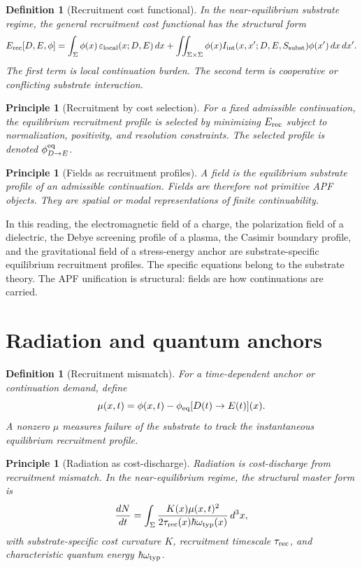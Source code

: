 \documentclass[11pt]{article}
\newtheorem{definition}[theorem]{Definition}
\newtheorem{principle}[theorem]{Principle}
\theoremstyle{remark}
\newcommand{\Erec}{E_{\rm rec}}
\begin{document}
\begin{definition}[Recruitment cost functional]
In the near-equilibrium substrate regime, the general recruitment cost functional has the structural form
\[
\Erec[D,E,\phi]
=
\int_\Sigma \phi(x)\,\varepsilon_{\rm local}(x;D,E)\,dx
+
\iint_{\Sigma\times\Sigma}\phi(x)I_{\rm int}(x,x';D,E,S_{\rm subst})\phi(x')\,dx\,dx'.
\]
The first term is local continuation burden.  The second term is cooperative or conflicting substrate interaction.
\end{definition}

\begin{principle}[Recruitment by cost selection]
For a fixed admissible continuation, the equilibrium recruitment profile is selected by minimizing \(\Erec\) subject to normalization, positivity, and resolution constraints.  The selected profile is denoted \(\phi^{\rm eq}_{D\to E}\).
\end{principle}

\begin{principle}[Fields as recruitment profiles]
A field is the equilibrium substrate profile of an admissible continuation.  Fields are therefore not primitive APF objects.  They are spatial or modal representations of finite continuability.
\end{principle}

In this reading, the electromagnetic field of a charge, the polarization field of a dielectric, the Debye screening profile of a plasma, the Casimir boundary profile, and the gravitational field of a stress-energy anchor are substrate-specific equilibrium recruitment profiles.  The specific equations belong to the substrate theory.  The APF unification is structural: fields are how continuations are carried.

\section{Radiation and quantum anchors}

\begin{definition}[Recruitment mismatch]
For a time-dependent anchor or continuation demand, define
\[
        \mu(x,t)=\phi(x,t)-\phi_{\rm eq}[D(t)\to E(t)](x).
\]
A nonzero \(\mu\) measures failure of the substrate to track the instantaneous equilibrium recruitment profile.
\end{definition}

\begin{principle}[Radiation as cost-discharge]
Radiation is cost-discharge from recruitment mismatch.  In the near-equilibrium regime, the structural master form is
\[
        \frac{dN}{dt}
        =
        \int_\Sigma
        \frac{K(x)\mu(x,t)^2}{2\tau_{\rm rec}(x)\hbar\omega_{\rm typ}(x)}\,d^3x,
\]
with substrate-specific cost curvature \(K\), recruitment timescale \(\tau_{\rm rec}\), and characteristic quantum energy \(\hbar\omega_{\rm typ}\).
\end{principle}
\end{document}
